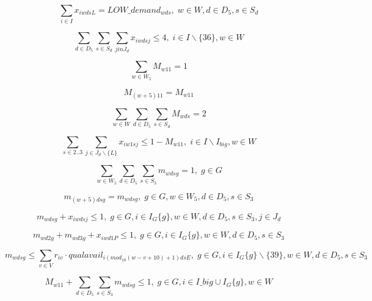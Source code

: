 \begin{equation}
\sum_{i \in I} x_{iwdsL} = LOW\_demand_{wds}, \;   w\in W,d\in D_5,s\in S_d
\end{equation}

\begin{equation}
\sum_{d \in D_5}\sum_{s \in S_d}\sum_{j in J_d} x_{iwdsj} \leq 4, \;   i\in I\backslash\{36\},w\in W
\end{equation}

\begin{equation}
\sum_{w \in W_5} M_{w11} = 1
\end{equation}

\begin{equation}
M_{(w+5)11} = M_{w11}
\end{equation}

\begin{equation}
\sum_{w \in W}\sum_{d \in D_5}\sum_{s \in S_d} M_{wds} = 2
\end{equation}

\begin{equation}
\sum_{s \in 2..3}\sum_{j \in J_d\backslash\{L\}} x_{iw1sj} \leq 1-M_{w11}, \;   i \in I\backslash I_{big}, w \in W
\end{equation}

\begin{equation}
\sum_{w \in W_5}\sum_{d \in D_5}\sum_{s \in S_3} m_{wdsg} = 1, \;   g \in G
\end{equation}

\begin{equation}
m_{(w+5)dsg} = m_{wdsg}, \;   g \in G, w \in W_5, d \in D_5, s \in S_3
\end{equation}

\begin{equation}
m_{wdsg} + x_{iwdsj} \leq 1, \;   g \in G, i \in I_G\{g\}, w \in W, d \in D_5, s \in S_3, j \in J_d
\end{equation}

\begin{equation}
m_{wd2g} + m_{wd3g} + x_{iwd1P} \leq 1, \;   g \in G, i \in I_G\{g\}, w \in W, d \in D_5, s \in S_3
\end{equation}

\begin{equation}
m_{wdsg} \leq \sum_{v \in V}r_{iv}\cdot qualavail_{i(mod_{10}(w-v+10)+1)dsE}, \;   g \in G, i \in I_G\{g\} \backslash \{39\}, w \in W, d \in D_5, s \in S_3
\end{equation}

\begin{equation}
M_{w11} + \sum_{d \in D_5}\sum_{s \in S_3} m_{wdsg} \leq 1, \;   g \in G, i \in I\_big \cup I_G\{g\}, w \in W
\end{equation}

